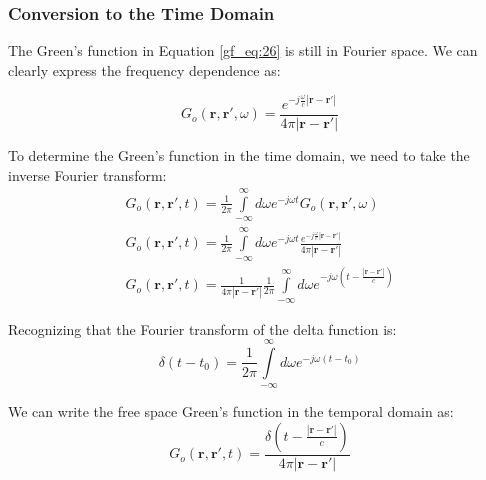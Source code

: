 \subsubsection{Conversion to the Time Domain}
The Green's function in Equation \ref{gf_eq:26} is still in Fourier space. We can clearly express the frequency dependence as:

\begin{equation}
G_o\left(\mathbf{r},\mathbf{r}',\omega\right) = \frac{e^{-j\frac{\omega}{c}|\mathbf{r} - \mathbf{r}'|}}{4\pi |\mathbf{r} - \mathbf{r}'|}
\label{gf_eq:28}
\end{equation}
\renewcommand{\baselinestretch}{2} \small\normalsize

To determine the Green's function in the time domain, we need to take the inverse Fourier transform:
\begin{equation}
\begin{gathered}
G_o\left(\mathbf{r},\mathbf{r}',t\right) = \frac{1}{2\pi}\int\limits_{-\infty}^{\infty}d\omega e^{-j\omega t}G_o\left(\mathbf{r},\mathbf{r}',\omega\right) \\
G_o\left(\mathbf{r},\mathbf{r}',t\right) = \frac{1}{2\pi}\int\limits_{-\infty}^{\infty}d\omega e^{-j\omega t}  \frac{e^{-j\frac{\omega}{c}|\mathbf{r}-\mathbf{r}'|}}{4\pi |\mathbf{r}-\mathbf{r}'|}\\
G_o\left(\mathbf{r},\mathbf{r}',t\right) = \frac{1}{4\pi |\mathbf{r}-\mathbf{r}'|}\frac{1}{2\pi}\int\limits_{-\infty}^{\infty}d\omega e^{-j\omega\left(t- \frac{|\mathbf{r}-\mathbf{r}'|}{c}\right)}
\end{gathered}
\label{gf_eq:29}
\end{equation}
\renewcommand{\baselinestretch}{2} \small\normalsize

Recognizing that the Fourier transform of the delta function is:
\begin{equation}
\delta(t-t_0) = \frac{1}{2\pi}\int\limits_{-\infty}^{\infty}d\omega e^{-j\omega \left(t-t_0\right)}
\label{gf_eq:30}
\end{equation}
\renewcommand{\baselinestretch}{2} \small\normalsize

We can write the free space Green's function in the temporal domain as:
\begin{equation}
\boxed{G_o\left(\mathbf{r},\mathbf{r}',t\right) = \frac{\delta\left(t-\frac{|\mathbf{r}-\mathbf{r}'|}{c} \right)}{4\pi |\mathbf{r}-\mathbf{r}'|}}
\label{gf_eq:31}
\end{equation}
\renewcommand{\baselinestretch}{2} \small\normalsize

